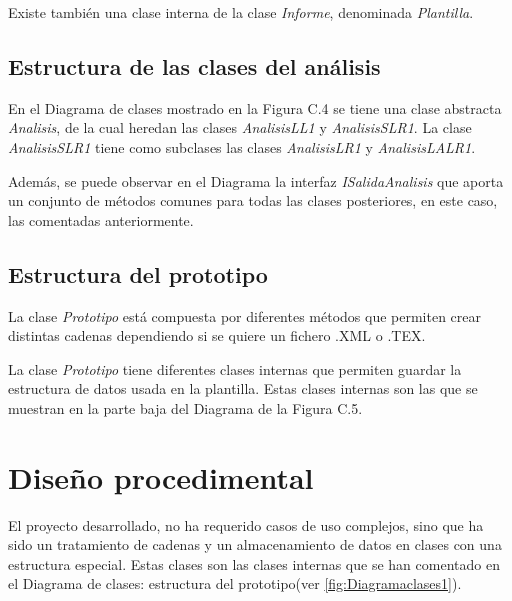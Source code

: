 Existe también una clase interna de la clase \textit{Informe}, denominada \textit{Plantilla}.


\subsection{Estructura de las clases del análisis}

En el Diagrama de clases mostrado en la Figura C.4 se tiene una clase abstracta \textit{Analisis}, de la cual heredan las clases \textit{AnalisisLL1} y \textit{AnalisisSLR1}. La clase \textit{AnalisisSLR1} tiene como subclases las clases \textit{AnalisisLR1} y \textit{AnalisisLALR1}.

Además, se puede observar en el Diagrama la interfaz \textit{ISalidaAnalisis} que aporta un conjunto de métodos comunes para todas las clases posteriores, en este caso, las comentadas anteriormente.


\subsection{Estructura del prototipo}

La clase \textit{Prototipo} está compuesta por diferentes métodos que permiten crear distintas cadenas dependiendo si se quiere un fichero .XML o .TEX.

La clase \textit{Prototipo} tiene diferentes clases internas que permiten guardar la estructura de datos usada en la plantilla. Estas clases internas son las que se muestran en la parte baja del Diagrama de la Figura C.5.


\section{Diseño procedimental}



El proyecto desarrollado, no ha requerido casos de uso complejos, sino que ha sido un tratamiento de cadenas y un almacenamiento de datos en clases con una estructura especial. Estas clases son las clases internas que se han comentado en el Diagrama de clases: estructura del prototipo(ver \ref{fig:Diagramaclases1}).

